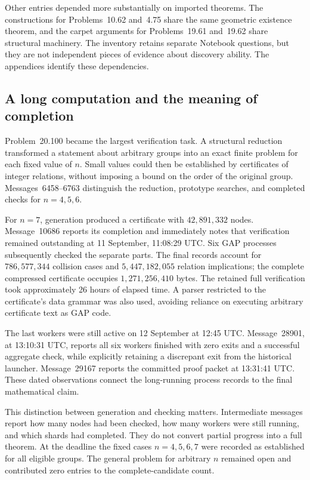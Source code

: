 Other entries depended more substantially on imported theorems.
The constructions for Problems~10.62 and~4.75 share the same geometric
existence theorem, and the carpet arguments for Problems~19.61 and~19.62
share structural machinery. The inventory retains separate Notebook
questions, but they are not independent pieces of evidence about
discovery ability. The appendices identify these dependencies.

\subsection{A long computation and the meaning of completion}

Problem~20.100 became the largest verification task. A structural
reduction transformed a statement about arbitrary groups into an exact
finite problem for each fixed value of \(n\). Small values could then be
established by certificates of integer relations, without imposing a
bound on the order of the original group. Messages~6458--6763 distinguish
the reduction, prototype searches, and completed checks for
\(n=4,5,6\).

For \(n=7\), generation produced a certificate with \(42{,}891{,}332\)
nodes. Message~10686 reports its completion and immediately notes that
verification remained outstanding at 11 September, 11:08:29 UTC.
Six GAP processes subsequently
checked the separate parts. The final records account for
\(786{,}577{,}344\) collision cases and \(5{,}447{,}182{,}055\)
relation implications; the complete compressed certificate occupies
\(1{,}271{,}256{,}410\) bytes. The retained full verification took
approximately 26 hours of elapsed time. A parser restricted to the
certificate's data grammar was also used, avoiding reliance on
executing arbitrary certificate text as GAP code.

The last workers were still active on 12 September at 12:45 UTC.
Message~28901, at 13:10:31 UTC, reports all six workers finished with
zero exits and a successful aggregate check, while explicitly retaining
a discrepant exit from the historical launcher. Message~29167 reports
the committed proof packet at 13:31:41 UTC. These dated observations
connect the long-running process records to the final mathematical claim.

This distinction between generation and checking matters. Intermediate
messages report how many nodes had been checked, how many workers were
still running, and which shards had completed. They do not convert
partial progress into a full theorem. At the deadline the fixed cases
\(n=4,5,6,7\) were recorded as established for all eligible groups.
The general problem for arbitrary \(n\) remained open and contributed
zero entries to the complete-candidate count.

